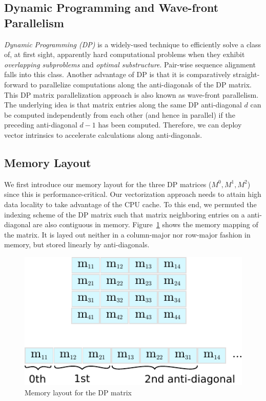 \documentclass[runningheads,a4paper]{llncs}
\begin{document}
\subsection{Dynamic Programming and Wave-front Parallelism}
\label{ssec:dynprogramming}

\textit{Dynamic Programming (DP)} is a widely-used technique to efficiently solve a class of, at first sight, apparently hard computational problems when they exhibit
\textit{overlapping subproblems} and \textit{optimal substructure}. 
Pair-wise sequence alignment falls into this class. 
Another advantage of DP is that it is comparatively straight-forward to parallelize computations along the anti-diagonals 
of the DP matrix. 
This DP matrix parallelization approach is also known as wave-front parallelism. 
The underlying idea is that matrix entries along the same DP anti-diagonal $d$ can be computed independently from each other  (and hence in parallel) 
if the preceding anti-diagonal $d-1$ has been computed. 
Therefore, we can deploy vector intrinsics to accelerate calculations along anti-diagonals.


\subsection{Memory Layout}
\label{ssec:memorylayout}

We first introduce our memory layout for the three DP matrices ($M^0, M^1, M^2$) since this is performance-critical.
Our vectorization approach needs to attain high data locality to take advantage of the CPU cache.
To this end,  we permuted the indexing scheme of the DP matrix such that matrix neighboring entries on a anti-diagonal are also contiguous in memory. 
Figure~\ref{fig:indexing} shows the memory mapping of the matrix. 
It is layed out neither in a column-major nor row-major fashion in memory, but stored linearly by anti-diagonals. 

\begin{figure}[ht!]
  \centering
  \includegraphics[scale=0.9]{figures/indexing.pdf}
  \caption{Memory layout for the DP matrix}
  \label{fig:indexing}
\end{figure}
\end{document}
